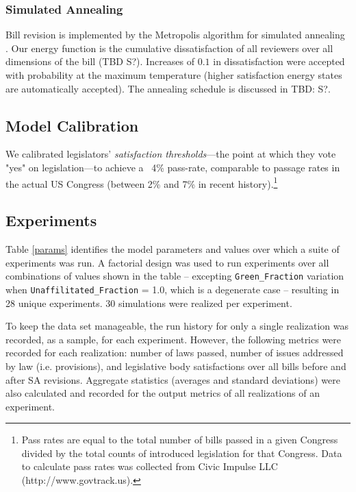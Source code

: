 \documentclass[pdftex,12pt]{llncs}
\begin{document}
\subsubsection{Simulated Annealing}
Bill revision is implemented by the Metropolis algorithm for simulated annealing \parencite{mrrt53, kgv}.
Our energy function is the cumulative dissatisfaction of all reviewers over all dimensions of the bill (TBD S?). Increases of $0.1$ in dissatisfaction were accepted with probability  at the maximum temperature (higher satisfaction energy states are automatically accepted).
The annealing schedule is discussed in TBD: S?.
\subsection{Model Calibration}
We calibrated legislators' \textit{satisfaction thresholds}---the point at which they vote "yes" on legislation---to achieve a ~4\% pass-rate, comparable to passage rates in the actual US Congress (between 2\% and 7\% in recent history).\footnote{Pass rates are equal to the total number of bills passed in a given Congress divided by the total counts of introduced legislation for that Congress. Data to calculate pass rates was collected from Civic Impulse LLC (http://www.govtrack.us).\label{passfn}}
\subsection{Experiments}
Table \ref{params} identifies the model parameters and values over which a suite of experiments was run.
A factorial design was used to run experiments over all combinations of values shown in the table -- excepting \texttt{Green\_Fraction} variation when {\texttt{Unaffilitated\_Fraction} = 1.0}, which is a degenerate case -- resulting in 28 unique experiments.
30 simulations were realized per experiment.

To keep the data set manageable, the run history for only a single realization was recorded, as a sample, for each experiment.
However, the following metrics were recorded for each realization: number of laws passed, number of issues addressed by law (i.e. provisions), and legislative body satisfactions over all bills before and after SA revisions.
Aggregate statistics (averages and standard deviations) were also calculated and recorded for the output metrics of all realizations of an experiment.
\end{document}
